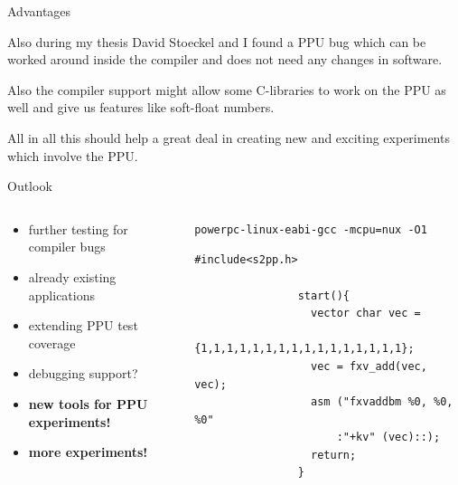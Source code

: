 \documentclass[10pt,aspectratio=169]{beamer}
\begin{document}
\begin{frame}[fragile]{Advantages}
{		Also during my thesis David Stoeckel and I found a PPU bug which can be worked around inside the compiler and does not need any changes in software.

		Also the compiler support might allow some C-libraries to work on the PPU as well and give us features like soft-float numbers.

		All in all this should help a great deal in creating new and exciting experiments which involve the PPU.
		
}
\end{frame}

\begin{frame}[fragile]{Outlook}
    \begin{columns}[c]
    \begin{column}{0.5\textwidth}
		\begin{itemize}[<1->]
			\setlength\itemsep{1em}
			\item further testing for compiler bugs
			\item already existing applications
			\item extending PPU test coverage
			\item debugging support?
			\item<2-> \textbf{new tools for PPU experiments!}
			\item<3-> \textbf{more experiments!}
        \end{itemize}
    \end{column}

    \begin{column}{0.5\textwidth}
        \centering
				\begin{lstlisting}[title=Compiling Directive]
powerpc-linux-eabi-gcc -mcpu=nux -O1
				\end{lstlisting}
				\begin{lstlisting}[title=Example File]
				#include<s2pp.h>
				
				start(){
				  vector char vec = 
				      {1,1,1,1,1,1,1,1,1,1,1,1,1,1,1,1};
				  vec = fxv_add(vec, vec);
				  asm ("fxvaddbm %0, %0, %0"
				      :"+kv" (vec)::);
				  return;
				}
				\end{lstlisting}
    \end{column}
    \end{columns}
\end{frame}
\end{document}
